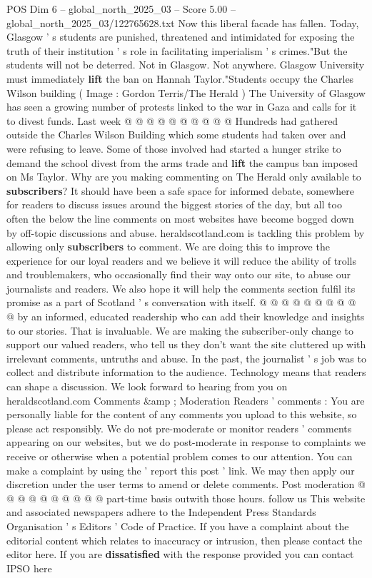\begin{textsample}{POS Dim 6 – global\_north\_2025\_03 – Score 5.00 – global\_north\_2025\_03/122765628.txt}
Now this liberal facade has fallen.
Today, Glasgow ' s students are punished, threatened and intimidated for exposing the truth of their institution ' s role in facilitating imperialism ' s crimes."But the students will not be deterred.
Not in Glasgow.
Not anywhere.
Glasgow University must immediately \textbf{lift} the ban on Hannah Taylor."Students occupy the Charles Wilson building ( Image : Gordon Terris/The Herald ) The University of Glasgow has seen a growing number of protests linked to the war in Gaza and calls for it to divest funds.
Last week @ @ @ @ @ @ @ @ @ @ Hundreds had gathered outside the Charles Wilson Building which some students had taken over and were refusing to leave.
Some of those involved had started a hunger strike to demand the school divest from the arms trade and \textbf{lift} the campus ban imposed on Ms Taylor.
Why are you making commenting on The Herald only available to \textbf{subscribers}?
It should have been a safe space for informed debate, somewhere for readers to discuss issues around the biggest stories of the day, but all too often the below the line comments on most websites have become bogged down by off-topic discussions and abuse. heraldscotland.com is tackling this problem by allowing only \textbf{subscribers} to comment.
We are doing this to improve the experience for our loyal readers and we believe it will reduce the ability of trolls and troublemakers, who occasionally find their way onto our site, to abuse our journalists and readers.
We also hope it will help the comments section fulfil its promise as a part of Scotland ' s conversation with itself. @ @ @ @ @ @ @ @ @ @ by an informed, educated readership who can add their knowledge and insights to our stories.
That is invaluable.
We are making the subscriber-only change to support our valued readers, who tell us they don't want the site cluttered up with irrelevant comments, untruths and abuse.
In the past, the journalist ' s job was to collect and distribute information to the audience.
Technology means that readers can shape a discussion.
We look forward to hearing from you on heraldscotland.com Comments \&amp ; Moderation Readers ' comments : You are personally liable for the content of any comments you upload to this website, so please act responsibly.
We do not pre-moderate or monitor readers ' comments appearing on our websites, but we do post-moderate in response to complaints we receive or otherwise when a potential problem comes to our attention.
You can make a complaint by using the ' report this post ' link.
We may then apply our discretion under the user terms to amend or delete comments.
Post moderation @ @ @ @ @ @ @ @ @ @ part-time basis outwith those hours. follow us This website and associated newspapers adhere to the Independent Press Standards Organisation ' s Editors ' Code of Practice.
If you have a complaint about the editorial content which relates to inaccuracy or intrusion, then please contact the editor here.
If you are \textbf{dissatisfied} with the response provided you can contact IPSO here

\end{textsample}
